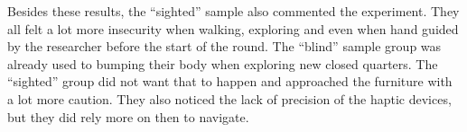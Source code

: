 Besides these results, the “sighted” sample also commented the experiment. They all felt a lot more insecurity when walking, exploring and even when hand guided by the researcher before the start of the round. The “blind” sample group was already used to bumping their body when exploring new closed quarters. The “sighted” group did not want that to happen and approached the furniture with a lot more caution. They also noticed the lack of precision of the haptic devices, but they did rely more on then to navigate.

